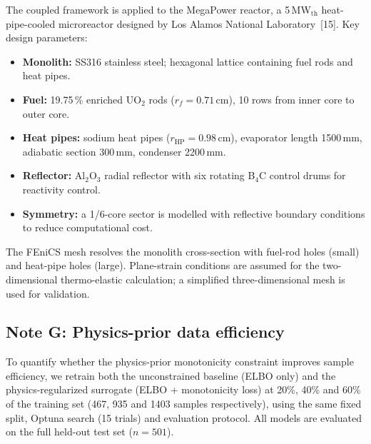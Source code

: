 \documentclass[11pt,a4paper]{article}
\begin{document}
The coupled framework is applied to the MegaPower reactor, a
5\,MW$_\mathrm{th}$ heat-pipe-cooled microreactor designed by Los Alamos
National Laboratory~[15]. Key design parameters:

\begin{itemize}\setlength{\itemsep}{0.15em}
\item \textbf{Monolith:} SS316 stainless steel; hexagonal lattice
  containing fuel rods and heat pipes.
\item \textbf{Fuel:} 19.75\,\% enriched UO$_2$ rods ($r_f = 0.71$\,cm),
  10 rows from inner core to outer core.
\item \textbf{Heat pipes:} sodium heat pipes ($r_\mathrm{HP} = 0.98$\,cm),
  evaporator length 1500\,mm, adiabatic section 300\,mm, condenser
  2200\,mm.
\item \textbf{Reflector:} Al$_2$O$_3$ radial reflector with six
  rotating B$_4$C control drums for reactivity control.
\item \textbf{Symmetry:} a 1/6-core sector is modelled with reflective
  boundary conditions to reduce computational cost.
\end{itemize}

The FEniCS mesh resolves the monolith cross-section with fuel-rod holes
(small) and heat-pipe holes (large). Plane-strain conditions are
assumed for the two-dimensional thermo-elastic calculation; a simplified
three-dimensional mesh is used for validation.


\subsection{Note G: Physics-prior data efficiency}
\label{sec:noteG}

To quantify whether the physics-prior monotonicity constraint improves
sample efficiency, we retrain both the unconstrained baseline (ELBO
only) and the physics-regularized surrogate (ELBO + monotonicity loss) at
20\%, 40\% and 60\% of the training set (467, 935 and 1403 samples
respectively), using the same fixed split, Optuna search (15 trials)
and evaluation protocol. All models are evaluated on the full held-out
test set ($n = 501$).
\end{document}
